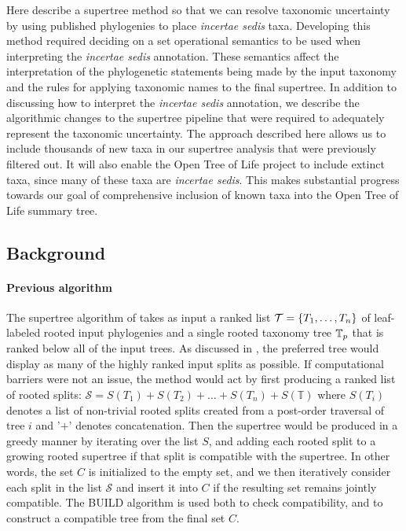 \documentclass[english]{article}
\begin{document}
Here describe a supertree method so that we can resolve taxonomic
uncertainty by using published phylogenies to place \emph{incertae
sedis} taxa.
Developing this method required deciding on a set
operational semantics to be used when interpreting the \emph{incertae
sedis} annotation.
These semantics affect the interpretation of the
phylogenetic statements being made by the input taxonomy and the rules
for applying taxonomic names to the final supertree.
In addition to
discussing how to interpret the \emph{incertae sedis} annotation,
we describe the algorithmic changes to the supertree pipeline that
were required to adequately represent the taxonomic uncertainty.
The
approach described here allows us to include thousands of new taxa in
our supertree analysis that were previously filtered out.
It will also
enable the Open Tree of Life project to include extinct taxa, since
many of these taxa are \emph{incertae sedis}.
This makes substantial
progress towards our goal of comprehensive inclusion of known taxa
into the Open Tree of Life summary tree.

\subsection{Background}

\paragraph{Previous algorithm}

The supertree algorithm of \citet{redelings2017supertree} takes as
input a ranked list $\mathcal{T}=\left\{ T_{1},\ldots,T_{n}\right\} $
of leaf-labeled rooted input phylogenies and a single rooted taxonomy
tree $\mbox{\ensuremath{\mathbb{T}}}_{p}$ that is ranked below all of the input trees.
As
discussed in \citet{redelings2017supertree}, the preferred tree would
display as many of the highly ranked input splits as possible.
If
computational barriers were not an issue, the method would act by
first producing a ranked list of rooted splits:
$\mathcal{S}=S(T_{1})+S(T_{2})+\ldots+S(T_{n})+S(\mathbb{T})$ where
$S(T_{i})$ denotes a list of non-trivial rooted splits created from a
post-order traversal of tree $i$ and '$+$' denotes concatenation.
Then
the supertree would be produced in a greedy manner by iterating over
the list $S$, and adding each rooted split to a growing rooted
supertree if that split is compatible with the supertree.
In other
words, the set $C$ is initialized to the empty set, and we then
iteratively consider each split in the list $\mathcal{S}$ and insert
it into $C$ if the resulting set remains jointly compatible.
The BUILD
algorithm\citep{AhoSSU1981} is used both to check compatibility, and
to construct a compatible tree from the final set $C$.
\end{document}
